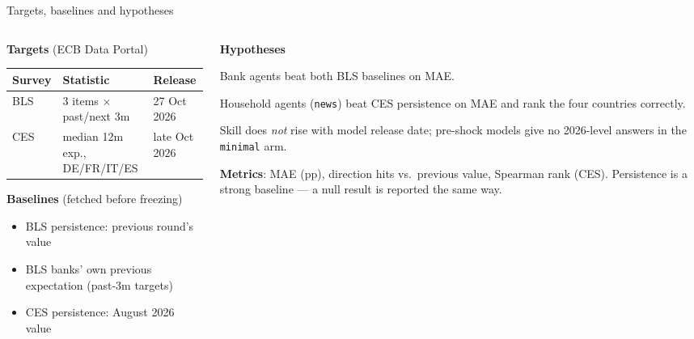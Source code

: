 \documentclass[aspectratio=169,10pt]{beamer}
\begin{document}
\begin{frame}{Targets, baselines and hypotheses}
  \footnotesize
  \begin{columns}[T]
    \begin{column}{0.48\textwidth}
      \textbf{Targets} (ECB Data Portal)\\[1mm]
      \scriptsize
      \begin{tabular}{@{}lll@{}}
        \toprule
        Survey & Statistic & Release \\
        \midrule
        \textcolor{bank}{BLS} & 3 items $\times$ past/next 3m & 27 Oct 2026 \\
        \textcolor{hh}{CES} & median 12m exp., DE/FR/IT/ES & late Oct 2026 \\
        \bottomrule
      \end{tabular}
      \footnotesize

      \vspace{3mm}
      \textbf{Baselines} (fetched before freezing)
      \begin{itemize}
        \item BLS persistence: previous round's value
        \item BLS banks' own previous expectation (past-3m targets)
        \item CES persistence: August 2026 value
      \end{itemize}
    \end{column}
    \begin{column}{0.5\textwidth}
      \textbf{Hypotheses}
      \begin{description}[H3]
        \item[H1] Bank agents beat both BLS baselines on MAE.
        \item[H2] Household agents (\texttt{news}) beat CES persistence on MAE and rank the four
                  countries correctly.
        \item[H3] Skill does \emph{not} rise with model release date; pre-shock models give no
                  2026-level answers in the \texttt{minimal} arm.
      \end{description}

      \textbf{Metrics}: MAE (pp), direction hits vs.\ previous value, Spearman rank (CES).
      Persistence is a strong baseline --- a null result is reported the same way.
    \end{column}
  \end{columns}
\end{frame}
\end{document}
